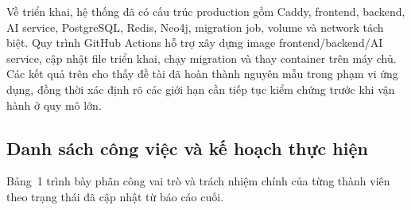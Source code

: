 \documentclass[12pt,a4paper]{article}
\begin{document}
Về triển khai, hệ thống đã có cấu trúc production gồm Caddy, frontend, backend, AI service, PostgreSQL, Redis, Neo4j, migration job, volume và network tách biệt. Quy trình GitHub Actions hỗ trợ xây dựng image frontend/backend/AI service, cập nhật file triển khai, chạy migration và thay container trên máy chủ. Các kết quả trên cho thấy đề tài đã hoàn thành nguyên mẫu trong phạm vi ứng dụng, đồng thời xác định rõ các giới hạn cần tiếp tục kiểm chứng trước khi vận hành ở quy mô lớn.

\subsection{Danh sách công việc và kế hoạch thực hiện}
\justifying

Bảng~1 trình bày phân công vai trò và trách nhiệm chính của từng thành viên theo trạng thái đã cập nhật từ báo cáo cuối.
\end{document}
